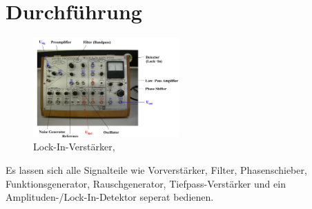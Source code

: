 \newpage
\section{Durchführung}
\label{sec:Durchfuehrung}
\begin{figure}
    \centering
    \includegraphics[width=0.5\textwidth]{bilder/aufbau.jpg}
    \caption{Lock-In-Verstärker,\cite[3]{Anleitung}}        
    \label{fig:aufbau}
\end{figure}


Es lassen sich alle Signalteile wie Vorverstärker, Filter, Phasenschieber, Funktionsgenerator, Rauschgenerator,
Tiefpass-Verstärker und ein Amplituden-/Lock-In-Detektor seperat bedienen.

